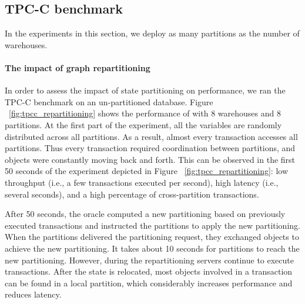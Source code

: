 
\subsection{TPC-C benchmark}
\label{sec:evaluation:tpc-c}

In the experiments in this section, we deploy as many partitions as the number of warehouses.

\paragraph{The impact of graph repartitioning}
In order to assess the impact of state partitioning on performance, we ran the TPC-C benchmark on an 
un-partitioned database.  Figure ~\ref{fig:tpcc_repartitioning} 
shows the performance of \dynastar with 8 warehouses and 8 partitions.
At the first part of the experiment, all the variables are randomly distributed across all partitions.
As a result, almost every transaction accesses all partitions. Thus every transaction 
required coordination between partitions, and objects were constantly moving back and forth. 
This can be observed in the first 50 seconds of the experiment depicted in Figure 
~\ref{fig:tpcc_repartitioning}: low throughput (i.e., a few transactions executed per second), 
high latency (i.e., several seconds), and a high percentage of cross-partition transactions.



After 50 seconds, the oracle computed a new partitioning based on previously executed transactions 
and instructed the partitions to apply the new partitioning.
When the partitions delivered the partitioning request, they exchanged objects to achieve the new partitioning.
It takes about 10 seconds for partitions to reach the new partitioning.
However, during the repartitioning servers continue to execute transactions.
After the state is relocated, most objects involved in a transaction
can be found in a local partition, which considerably increases performance and reduces latency. 

